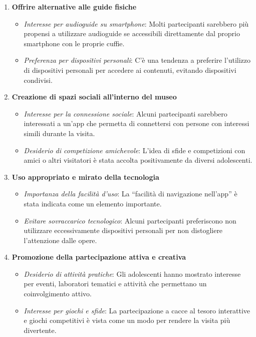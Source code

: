 \documentclass{article}
\begin{document}
\begin{enumerate}
    \item \textbf{Offrire alternative alle guide fisiche}
        \begin{itemize}
            \item \textit{Interesse per audioguide su smartphone}: Molti partecipanti sarebbero più propensi a utilizzare audioguide se accessibili direttamente dal proprio smartphone con le proprie cuffie.
            \item \textit{Preferenza per dispositivi personali}: C'è una tendenza a preferire l'utilizzo di dispositivi personali per accedere ai contenuti, evitando dispositivi condivisi.
        \end{itemize}
    
    \item \textbf{Creazione di spazi sociali all'interno del museo}
        \begin{itemize}
            \item \textit{Interesse per la connessione sociale}: Alcuni partecipanti sarebbero interessati a un'app che permetta di connettersi con persone con interessi simili durante la visita.
            \item \textit{Desiderio di competizione amichevole}: L'idea di sfide e competizioni con amici o altri visitatori è stata accolta positivamente da diversi adolescenti.
        \end{itemize}

    \item \textbf{Uso appropriato e mirato della tecnologia}
        \begin{itemize}
            \item \textit{Importanza della facilità d'uso}: La ``facilità di navigazione nell'app'' è stata indicata come un elemento importante.
            \item \textit{Evitare sovraccarico tecnologico}: Alcuni partecipanti preferiscono non utilizzare eccessivamente dispositivi personali per non distogliere l'attenzione dalle opere.
        \end{itemize}
        
    \item \textbf{Promozione della partecipazione attiva e creativa}
        \begin{itemize}
            \item \textit{Desiderio di attività pratiche}: Gli adolescenti hanno mostrato interesse per eventi, laboratori tematici e attività che permettano un coinvolgimento attivo.
            \item \textit{Interesse per giochi e sfide}: La partecipazione a cacce al tesoro interattive e giochi competitivi è vista come un modo per rendere la visita più divertente.
        \end{itemize}


\end{enumerate}
\end{document}

